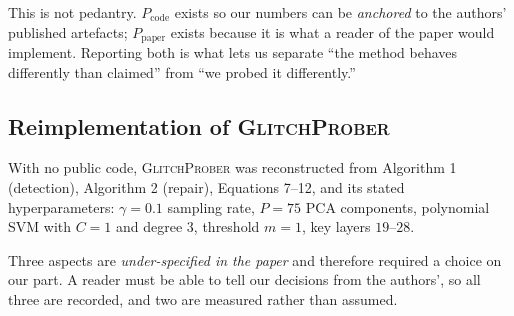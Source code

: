 \documentclass[11pt,a4paper]{article}
\newcommand{\gp}{\textsc{GlitchProber}}
\newcommand{\Ppaper}{$P_{\mathrm{paper}}$}
\newcommand{\Pcode}{$P_{\mathrm{code}}$}
\begin{document}
This is not pedantry. \Pcode{} exists so our numbers can be \emph{anchored} to the
authors' published artefacts; \Ppaper{} exists because it is what a reader of the
paper would implement. Reporting both is what lets us separate ``the method
behaves differently than claimed'' from ``we probed it differently.''

\subsection{Reimplementation of \gp{}}
\label{sec:gp-reimpl}

With no public code, \gp{} was reconstructed from Algorithm 1 (detection),
Algorithm 2 (repair), Equations 7--12, and its stated hyperparameters:
$\gamma = 0.1$ sampling rate, $P = 75$ PCA components, polynomial SVM with $C=1$
and degree $3$, threshold $m=1$, key layers $19$--$28$.

Three aspects are \emph{under-specified in the paper} and therefore required a
choice on our part. A reader must be able to tell our decisions from the authors',
so all three are recorded, and two are measured rather than assumed.
\end{document}
